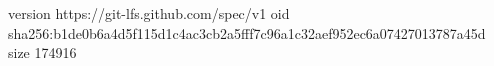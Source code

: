version https://git-lfs.github.com/spec/v1
oid sha256:b1de0b6a4d5f115d1c4ac3cb2a5fff7c96a1c32aef952ec6a07427013787a45d
size 174916
